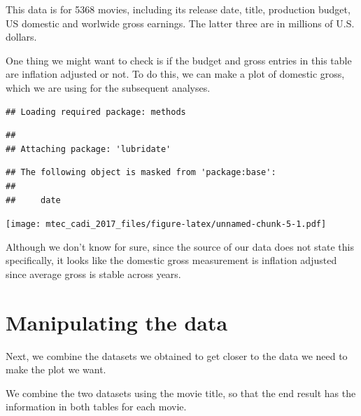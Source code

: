 \documentclass[12pt,]{book}
\theoremstyle{definition}
\theoremstyle{definition}
\theoremstyle{remark}
\begin{document}
This data is for 5368 movies, including its release date, title,
production budget, US domestic and worlwide gross earnings. The latter
three are in millions of U.S. dollars.

One thing we might want to check is if the budget and gross entries in
this table are inflation adjusted or not. To do this, we can make a plot
of domestic gross, which we are using for the subsequent analyses.

\begin{verbatim}
## Loading required package: methods
\end{verbatim}

\begin{verbatim}
## 
## Attaching package: 'lubridate'
\end{verbatim}

\begin{verbatim}
## The following object is masked from 'package:base':
## 
##     date
\end{verbatim}

\texttt{[image: mtec\_cadi\_2017\_files/figure-latex/unnamed-chunk-5-1.pdf]}

Although we don't know for sure, since the source of our data does not
state this specifically, it looks like the domestic gross measurement is
inflation adjusted since average gross is stable across years.

\section{Manipulating the data}\label{manipulating-the-data}

Next, we combine the datasets we obtained to get closer to the data we
need to make the plot we want.

We combine the two datasets using the movie title, so that the end
result has the information in both tables for each movie.
\end{document}
